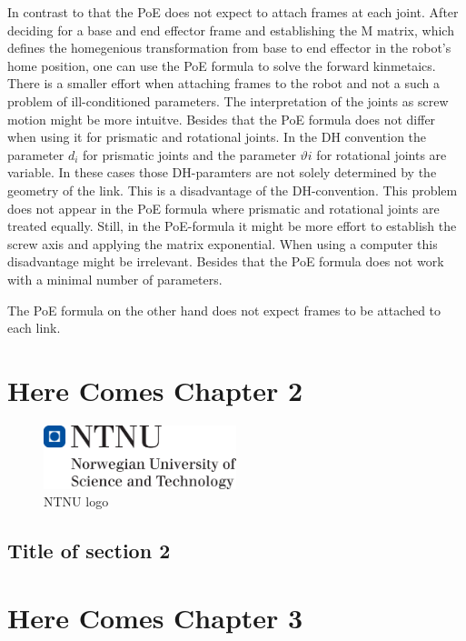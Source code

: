 \documentclass{tpk4170report}
\begin{document}
In contrast to that the PoE does not expect to attach frames at each joint. After deciding for a base and end effector frame and   establishing the M matrix, which defines the homegenious transformation from base to end effector in the robot's home position, one can use the PoE formula to solve the forward kinmetaics. There is a smaller effort when attaching frames to the robot and not a such a problem of ill-conditioned parameters. The interpretation of the joints as screw motion might be more intuitve. Besides that the PoE formula does not differ when using it for prismatic and rotational joints. In the DH convention the parameter \(d_{i}\) for prismatic joints and the parameter \(\vartheta{i}\) for rotational joints are variable. In these cases those DH-paramters are not solely determined by the geometry of the link. This is a disadvantage of the DH-convention. This problem does not appear in the PoE formula where prismatic and rotational joints are treated equally. Still, in the PoE-formula it might be more effort to establish the screw axis and applying the matrix exponential. When using a computer this disadvantage might be irrelevant. Besides that the PoE formula does not work with a minimal number of parameters. 



The PoE formula on the other hand does not expect frames to be attached to each link. 
\chapter{Here Comes Chapter 2}

\Blindtext

\begin{figure}
  \centering
  \includegraphics[width=0.5\textwidth]{hovedlogo} 
  \caption{NTNU logo}
  \label{fig:logo2}
\end{figure}

\section{Title of section 2}








\chapter{Here Comes Chapter 3}
\end{document}

